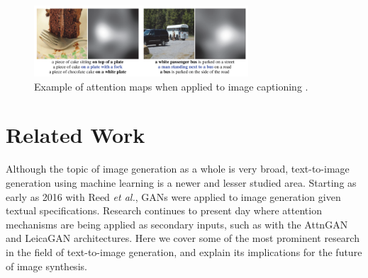 \documentclass[letterpaper]{article} %
\begin{document}
\begin{figure}[htbp]
\centerline{\includegraphics[width=8cm]{attention_example.png}}
\caption{Example of attention maps when applied to image captioning 
\cite{text_captioning}.}
\label{fig:attention_example}
\end{figure}

\section{Related Work}
Although the topic of image generation as a whole is very broad, text-to-image 
generation using machine learning is a newer and lesser studied area. Starting 
as early as 2016 with Reed \textit{et al.}, GANs were applied to image 
generation given textual specifications. Research continues to present day 
where attention mechanisms are being applied as secondary inputs, such as with 
the AttnGAN \cite{attngan} and LeicaGAN \cite{leica} architectures. Here we 
cover some of the most prominent research in the field of text-to-image 
generation, and explain its implications for the future of image synthesis.


\end{document}

